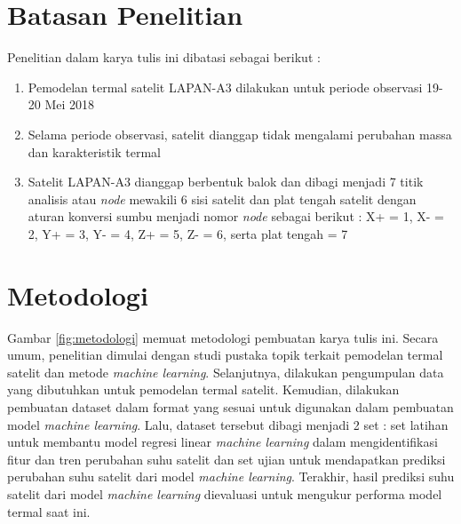 \section{Batasan Penelitian}

Penelitian dalam karya tulis ini dibatasi sebagai berikut :

\begin{enumerate}
\item Pemodelan termal satelit LAPAN-A3 dilakukan untuk periode observasi 19-20 Mei 2018
\item Selama periode observasi, satelit dianggap tidak mengalami perubahan massa dan karakteristik termal
\item Satelit LAPAN-A3 dianggap berbentuk balok dan dibagi menjadi 7 titik
	analisis atau \textit{node} mewakili 6 sisi satelit dan plat tengah satelit dengan
		aturan konversi sumbu menjadi nomor \textit{node} sebagai berikut : X+ = 1, X- = 2,
		Y+ = 3, Y- = 4, Z+ = 5, Z- = 6, serta plat tengah = 7
\end{enumerate}

\section{Metodologi}

Gambar \ref{fig:metodologi} memuat metodologi pembuatan karya tulis ini. Secara
umum, penelitian dimulai dengan studi pustaka topik terkait pemodelan termal
satelit dan metode \textit{machine learning}. Selanjutnya, dilakukan
pengumpulan data yang dibutuhkan untuk pemodelan termal satelit. Kemudian,
dilakukan pembuatan dataset dalam format yang sesuai untuk digunakan dalam
pembuatan model \textit{machine learning}. Lalu, dataset tersebut dibagi
menjadi 2 set : set latihan untuk membantu model regresi linear \textit{machine
learning} dalam mengidentifikasi fitur dan tren perubahan suhu satelit dan set
ujian untuk mendapatkan prediksi perubahan suhu satelit dari model
\textit{machine learning}. Terakhir, hasil prediksi suhu satelit dari model
\textit{machine learning} dievaluasi untuk mengukur performa model termal saat ini.

